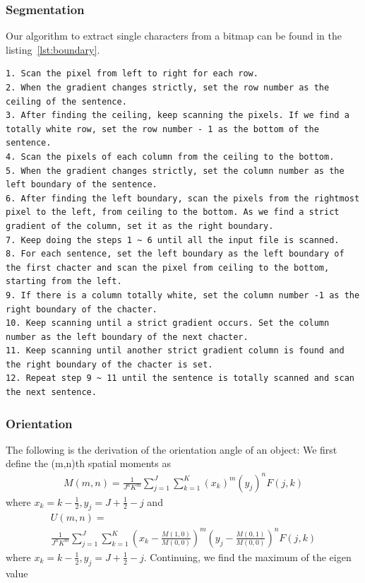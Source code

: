 \documentclass{article}
\begin{document}
\subsubsection{Segmentation}
Our algorithm to extract single characters from a bitmap can be found in the listing~\ref{lst:boundary}.
\begin{lstlisting}[caption={Segment Extraction algorithm},label={lst:boundary}]
1. Scan the pixel from left to right for each row.
2. When the gradient changes strictly, set the row number as the ceiling of the sentence.
3. After finding the ceiling, keep scanning the pixels. If we find a totally white row, set the row number - 1 as the bottom of the sentence.
4. Scan the pixels of each column from the ceiling to the bottom.
5. When the gradient changes strictly, set the column number as the left boundary of the sentence.
6. After finding the left boundary, scan the pixels from the rightmost pixel to the left, from ceiling to the bottom. As we find a strict gradient of the column, set it as the right boundary.
7. Keep doing the steps 1 ~ 6 until all the input file is scanned.
8. For each sentence, set the left boundary as the left boundary of the first chacter and scan the pixel from ceiling to the bottom, starting from the left.
9. If there is a column totally white, set the column number -1 as the right boundary of the chacter.
10. Keep scanning until a strict gradient occurs. Set the column number as the left boundary of the next chacter.
11. Keep scanning until another strict gradient column is found and the right boundary of the chacter is set.
12. Repeat step 9 ~ 11 until the sentence is totally scanned and scan the next sentence.
\end{lstlisting}

\subsubsection{Orientation}

The following is the derivation of the orientation angle of an object:
We first define the (m,n)th spatial moments as
\begin{multline}
M(m,n)=\frac{1}{J^n K^m}\sum_{j=1}^J\sum_{k=1}^K (x_k)^m (y_j)^n F(j,k)
\end{multline}
where $x_k=k-\frac{1}{2}, y_j=J+\frac{1}{2}-j$ and
\begin{multline}
U(m,n)= \\ \frac{1}{J^n K^m}\sum_{j=1}^J\sum_{k=1}^K \left(x_k-\frac{M(1,0)}{M(0,0)}\right)^m  \left(y_j-\frac{M(0,1)}{M(0,0)}\right)^n F(j,k)
\end{multline}
where $x_k=k-\frac{1}{2}, y_j=J+\frac{1}{2}-j$. Continuing, we find the maximum of the eigen value
\end{document}
